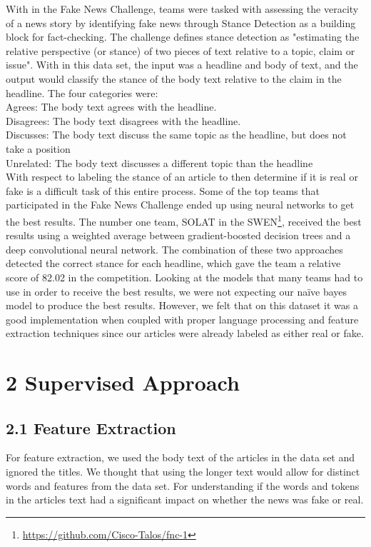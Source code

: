 \documentclass{neu_handout}
\begin{document}
With in the Fake News Challenge, teams were tasked with assessing the veracity of a news story by identifying fake news through Stance Detection as a building block for fact-checking. The challenge defines stance detection as "estimating the relative perspective (or stance) of two pieces of text relative to a topic, claim or issue". With in this data set, the input was a headline and body of text, and the output would classify the stance of the body text relative to the claim in the headline. The four categories were:\\
Agrees: The body text agrees with the headline.\\
Disagrees: The body text disagrees with the headline.\\
Discusses: The body text discuss the same topic as the headline, but does not take a position\\
Unrelated: The body text discusses a different topic than the headline\\

With respect to labeling the stance of an article to then determine if it is real or fake is a difficult task of this entire process. Some of the top teams that participated in the Fake News Challenge ended up using neural networks to get the best results. The number one team, SOLAT in the SWEN\footnote{\url{https://github.com/Cisco-Talos/fnc-1}}, received the best results using a weighted average between gradient-boosted decision trees and a deep convolutional neural network. The combination of these two approaches detected the correct stance for each headline, which gave the team a relative score of 82.02 in the competition. Looking at the models that many teams had to use in order to receive the best results, we were not expecting our na\"ive bayes model to produce the best results. However, we felt that on this dataset it was a good implementation when coupled with proper language processing and feature extraction techniques since our articles were already labeled as either real or fake.

\section*{2 Supervised Approach}

\subsection*{2.1 Feature Extraction}

For feature extraction, we used the body text of the articles in the data set and ignored the titles. We thought that using the longer text would allow for distinct words and features from the data set. For understanding if the words and tokens in the articles text had a significant impact on whether the news was fake or real.\\
\end{document}
